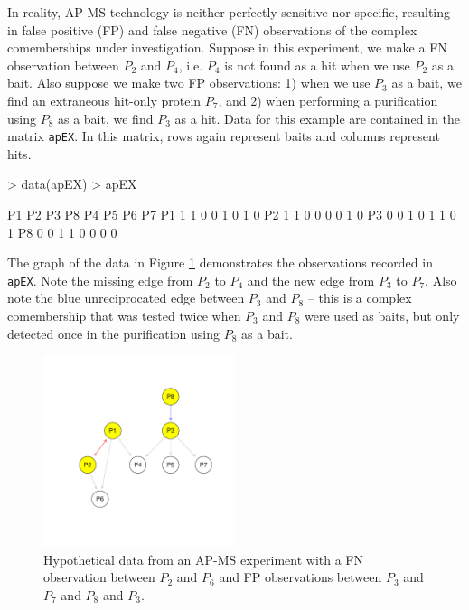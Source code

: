 \documentclass[11pt]{article}
\newcommand{\Robject}[1]{{\texttt{#1}}}
\begin{document}
In reality, AP-MS technology is neither perfectly sensitive nor specific,
resulting in false positive (FP) and false negative (FN) observations of
the complex comemberships under investigation.
Suppose in this experiment, we make a FN observation between $P_{2}$ and
$P_{4}$, i.e. $P_{4}$ is not found as a hit when we use $P_{2}$ as a bait.
Also suppose we make two FP observations: 1) when we use $P_{3}$
as a bait, we find an extraneous hit-only protein $P_{7}$, and 2) when performing
a purification using $P_{8}$ as a bait, we find $P_{3}$ as a hit.
Data for this example are contained in the matrix \Robject{apEX}.  In this
matrix, rows again represent baits and columns represent hits.


\begin{Schunk}
\begin{Sinput}
> data(apEX)
> apEX
\end{Sinput}
\begin{Soutput}
   P1 P2 P3 P8 P4 P5 P6 P7
P1  1  1  0  0  1  0  1  0
P2  1  1  0  0  0  0  1  0
P3  0  0  1  0  1  1  0  1
P8  0  0  1  1  0  0  0  0
\end{Soutput}
\end{Schunk}

The graph of the data in Figure \ref{fig:observedData} demonstrates the observations recorded in \Robject{apEX}.
Note the missing edge from $P_{2}$ to $P_{4}$ and the new edge from $P_{3}$ to
$P_{7}$.  Also note the blue
unreciprocated edge between $P_{3}$ and $P_{8}$ -- this is a complex
comembership that was tested twice when $P_{3}$ and $P_{8}$ were used as baits, but
only detected once in the purification using $P_{8}$ as a bait.



\begin{figure}[htbp]
\begin{center}
\includegraphics[width=0.5\textwidth]{apComplex-observedData}
\caption{\label{fig:observedData} Hypothetical data from an AP-MS experiment
with a FN observation between $P_{2}$ and $P_{6}$ and FP observations 
between $P_{3}$ and $P_{7}$ and $P_{8}$ and $P_{3}$.}
\end{center}
\end{figure}
\end{document}
